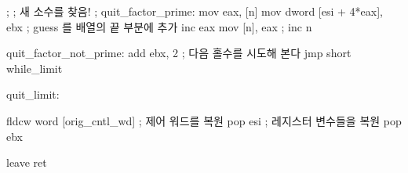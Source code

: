 \begin{AsmCodeListing}[label=prime2.asm]
;
; 새 소수를 찾음!
;
quit_factor_prime:
        mov     eax, [n]
        mov     dword [esi + 4*eax], ebx        ; guess 를 배열의 끝 부분에 추가 
        inc     eax
        mov     [n], eax                        ; inc n

quit_factor_not_prime:
        add     ebx, 2                          ; 다음 홀수를 시도해 본다 
        jmp     short while_limit

quit_limit:

        fldcw   word [orig_cntl_wd]             ; 제어 워드를 복원 
        pop     esi                             ; 레지스터 변수들을 복원 
        pop     ebx

        leave
        ret 
\end{AsmCodeListing}
